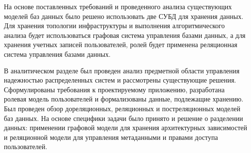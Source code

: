 На основе поставленных требований и проведенного анализа существующих моделей баз данных
было решено использовать две СУБД для хранения данных. Для хранения топологии
инфраструктуры и выполнения алгоритмического анализа будет использоваться графовая
система управления базами данных, а для хранения учетных записей пользователей,
ролей будет применена реляционная система управления базами данных.

В аналитическом разделе был проведен анализ предметной области управления
надежностью распределенных систем и рассмотрены существующие решения. Сформулированы
требования к проектируемому приложению, разработана ролевая модель пользователей и
формализованы данные, подлежащие хранению. Был проведен обзор дореляционных, реляционных
и постреляционных моделей баз данных. На основе специфики задачи было принято и
решение о разделении данных: применении графовой модели для хранения
архитектурных зависимостей и реляционной модели для управления метаданными и правами
доступа пользователей.
